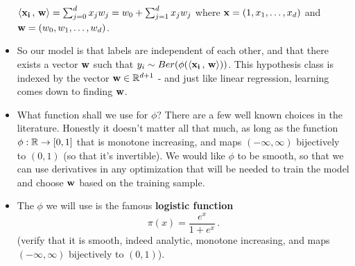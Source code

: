 \begin{itemize}
	${\left\langle \mathbf{x_i}\,,\,\mathbf{w} \right\rangle} = \sum_{j=0}^d x_j w_j = w_0 +\sum_{j=1}^d x_j
	w_j$ where $\mathbf{x}=(1,x_1,\ldots,x_d)$ and $\mathbf{w}=(w_0,w_1,\ldots,w_d)$.
    \item So our model is that labels are independent of each other, and that
      there exists a vector $\mathbf{w}$ such that  $y_i \sim Ber(\phi
      ({\left\langle \mathbf{x_i}\,,\,\mathbf{w} \right\rangle} ))$.
      This hypothesis class is indexed by the vector $\mathbf{w}\in\mathbb{R}^{d+1}$ - and just like
      linear regression, learning comes down to finding $\mathbf{w}$. 
    \item What function shall we use for $\phi$? There are a few well known choices in the
      literature. Honestly it doesn't matter all that much, as long as the
      function $\phi:\mathbb{R}\to[0,1]$ that is monotone increasing, and maps
      $(-\infty,\infty)$ bijectively to $(0,1)$ (so that it's invertible). 
      We would like $\phi$ to be smooth, so that we can use derivatives in
      any optimization that will be needed to train the model and choose $\mathbf{w}$
      based on the training sample. 
    \item The $\phi$ we will use is the famous {\bf logistic function}
      \[\pi(x) = \frac{e^x}{1+e^x}\,.\] (verify that it is smooth, indeed
	analytic,  monotone increasing, and maps
      $(-\infty,\infty)$ bijectively to $(0,1)$). 
  \end{itemize}
